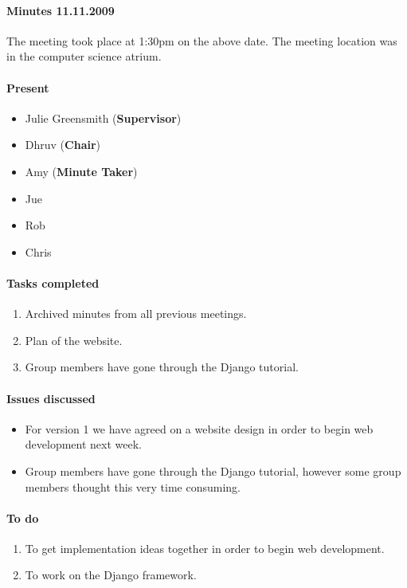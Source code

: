 \paragraph{Minutes 11.11.2009}  
The meeting took place at 1:30pm on the above date. The meeting location was in the computer science atrium. 

\paragraph{Present}

\begin{itemize}
	\item Julie Greensmith (\textbf{Supervisor})
	\item Dhruv (\textbf{Chair})
	\item Amy (\textbf{Minute Taker})
	\item Jue
	\item Rob
	\item Chris 
	
\end{itemize}

\paragraph{Tasks completed}

\begin{enumerate}
	\item Archived minutes from all previous meetings.
	\item Plan of the website.
	\item Group members have gone through the Django tutorial. 
\end{enumerate}

\paragraph{Issues discussed}

\begin{itemize}
	\item For version 1 we have agreed on a website design in order to begin web development next week.
	\item Group members have gone through the Django tutorial, however some group members thought this very time consuming.
	
\end{itemize}

\paragraph{To do}

\begin{enumerate}
	\item To get implementation ideas together in order to begin web development. 
	\item To work on the Django framework.
\end{enumerate}
